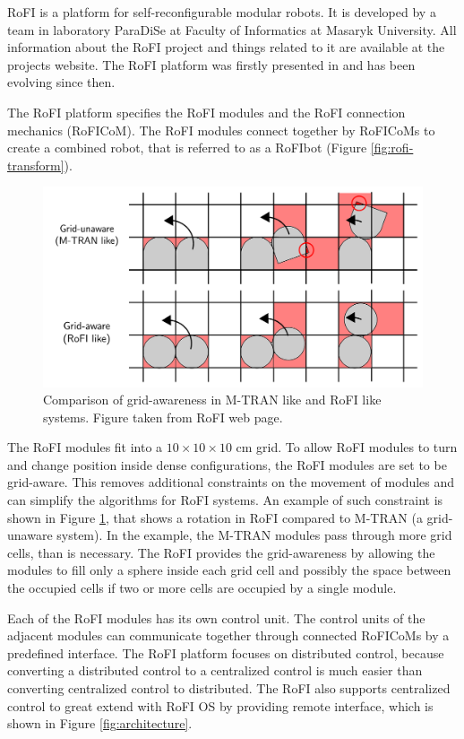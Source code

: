 \documentclass[
  digital, %
  table,   %
  oneside, %
  nolof,     %
  nolot,     %
]{fithesis3}
\begin{document}
RoFI is a platform for self-reconfigurable modular robots.
It is developed by a team in laboratory ParaDiSe\cite{paradise-web} at Faculty of Informatics at Masaryk University.
All information about the RoFI project and things related to it are available at the projects website\cite{rofi-web}.
The RoFI platform was firstly presented in \cite{rofi-thesis} and has been evolving since then.

The RoFI platform specifies the RoFI modules and the RoFI connection mechanics (RoFICoM).
The RoFI modules connect together by RoFICoMs to create a combined robot, that is referred to as a RoFIbot\label{rofibot} (Figure \ref{fig:rofi-transform}).

\begin{figure}
    \centering
    \includegraphics[width=\linewidth]{data/grid_aware.pdf}
    \caption{Comparison of grid-awareness in M-TRAN like and RoFI like systems. Figure taken from RoFI web page\cite{rofi-web}.}
    \label{fig:grid-aware}
\end{figure}

The RoFI modules fit into a $10 \times 10 \times 10$ cm grid.
To allow RoFI modules to turn and change position inside dense configurations, the RoFI modules are set to be grid-aware.
This removes additional constraints on the movement of modules and can simplify the algorithms for RoFI systems.
An example of such constraint is shown in Figure \ref{fig:grid-aware}, that shows a rotation in RoFI compared to M-TRAN\cite{mtran} (a grid-unaware system).
In the example, the M-TRAN modules pass through more grid cells, than is necessary.
The RoFI provides the grid-awareness by allowing the modules to fill only a sphere inside each grid cell and possibly the space between the occupied cells if two or more cells are occupied by a single module.

Each of the RoFI modules has its own control unit.
The control units of the adjacent modules can communicate together through connected RoFICoMs by a predefined interface.
The RoFI platform focuses on distributed control, because converting a distributed control to a centralized control is much easier than converting centralized control to distributed.
The RoFI also supports centralized control to great extend with RoFI OS by providing remote interface, which is shown in Figure \ref{fig:architecture}.
\end{document}
